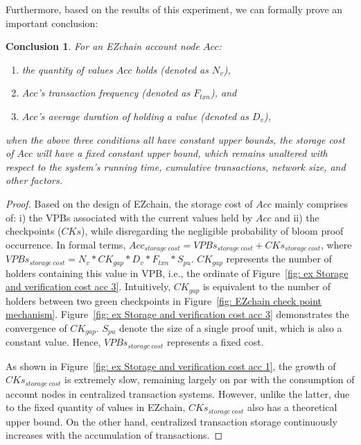 \documentclass[conference]{IEEEtran}
\newtheorem{theorem}{Conclusion}
\begin{document}
Furthermore, based on the results of this experiment, we can formally prove an important conclusion: 

\begin{theorem}
For an EZchain account node $Acc$:
\begin{enumerate}
\item the quantity of values $Acc$ holds (denoted as $N_v$),
\item $Acc$'s transaction frequency (denoted as $F_{txn}$), and
\item $Acc$'s average duration of holding a value (denoted as $D_v$),
\end{enumerate}
when the above three conditions all have constant upper bounds, the storage cost of $Acc$ will have a fixed constant upper bound, which remains unaltered with respect to the system's running time, cumulative transactions, network size, and other factors.
\label{Conclusion: acc storage cost}
\end{theorem}

\begin{proof}
Based on the design of EZchain, the storage cost of $Acc$ mainly comprises of: i) the VPBs associated with the current values held by $Acc$ and ii) the checkpoints ($CKs$), while disregarding the negligible probability of bloom proof occurrence. In formal terms, $Acc_{storage~cost} = VPBs_{storage~cost} + CKs_{storage~cost}$, where $VPBs_{storage~cost} = N_v*CK_{gap}*D_v*F_{txn}*S_{pu}$. $CK_{gap}$ represents the number of holders containing this value in VPB, i.e., the ordinate of Figure~\ref{fig: ex Storage and verification cost acc 3}. Intuitively, $CK_{gap}$ is equivalent to the number of holders between two green checkpoints in Figure~\ref{fig: EZchain check point mechanism}. Figure~\ref{fig: ex Storage and verification cost acc 3} demonstrates the convergence of $CK_{gap}$. $S_{pu}$ denote the size of a single proof unit, which is also a constant value. Hence, $VPBs_{storage~cost}$ represents a fixed cost.

As shown in Figure~\ref{fig: ex Storage and verification cost acc 1}, the growth of $CKs_{storage~cost}$ is extremely slow, remaining largely on par with the consumption of account nodes in centralized transaction systems. However, unlike the latter, due to the fixed quantity of values in EZchain, $CKs_{storage~cost}$ also has a theoretical upper bound. On the other hand, centralized transaction storage continuously increases with the accumulation of transactions.
\end{proof}
\end{document}
